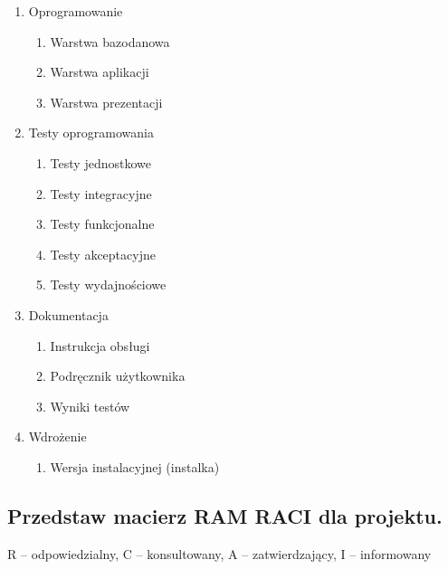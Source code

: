 \begin{enumerate}
\begin{enumerate}
\item Oprogramowanie

\begin{enumerate}

\item Warstwa bazodanowa
\item Warstwa aplikacji
\item Warstwa prezentacji

\end{enumerate}

\item Testy oprogramowania

\begin{enumerate}

\item Testy jednostkowe
\item Testy integracyjne
\item Testy funkcjonalne
\item Testy akceptacyjne
\item Testy wydajnościowe

\end{enumerate}

\item Dokumentacja

\begin{enumerate}

\item Instrukcja obsługi
\item Podręcznik użytkownika
\item Wyniki testów

\end{enumerate}

\item Wdrożenie

\begin{enumerate}

\item Wersja instalacyjnej (instalka)

\end{enumerate}
\end{enumerate}
\end{enumerate}



\subsection*{Przedstaw macierz RAM RACI dla projektu.}

R – odpowiedzialny, C – konsultowany, A – zatwierdzający, I – informowany

